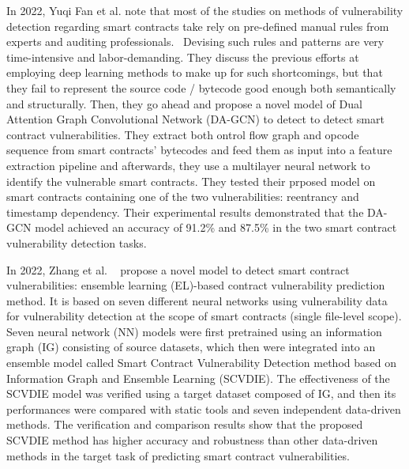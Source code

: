 In 2022, Yuqi Fan et al. note that most of the studies on methods of vulnerability detection regarding smart contracts take rely on pre-defined manual rules from experts and auditing professionals.~\cite{fan2021smart}
Devising such rules and patterns are very time-intensive and labor-demanding.
They discuss the previous efforts at employing deep learning methods to make up for such shortcomings, but that they fail to represent the source code / bytecode good enough both semantically and structurally.
Then, they go ahead and propose a novel model of Dual Attention Graph Convolutional Network (DA-GCN) to detect to detect smart contract vulnerabilities.
They extract both ontrol flow graph and opcode sequence from smart contracts' bytecodes and feed them as input  into a feature extraction pipeline and afterwards, they use a multilayer neural network to identify the vulnerable smart contracts.
They tested their prposed model on smart contracts containing one of the two vulnerabilities: reentrancy and timestamp dependency.
Their experimental results demonstrated that the DA-GCN model achieved an accuracy of 91.2\% and 87.5\% in the two smart contract vulnerability detection tasks.

In 2022, Zhang et al. ~\cite{zhang2022novel} propose a novel model to detect smart contract vulnerabilities: ensemble learning (EL)-based contract vulnerability prediction method.
It is based on seven different neural networks using vulnerability data for vulnerability detection at the scope of smart contracts (single file-level scope).
Seven neural network (NN) models were first pretrained using an information graph (IG) consisting of source datasets, which then were
integrated into an ensemble model called Smart Contract Vulnerability Detection method based on
Information Graph and Ensemble Learning (SCVDIE). The effectiveness of the SCVDIE model was
verified using a target dataset composed of IG, and then its performances were compared with static
tools and seven independent data-driven methods. The verification and comparison results show that
the proposed SCVDIE method has higher accuracy and robustness than other data-driven methods
in the target task of predicting smart contract vulnerabilities.

